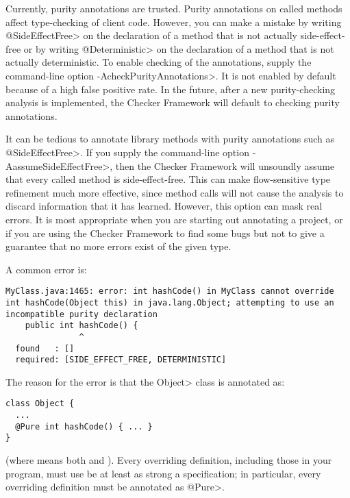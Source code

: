 
Currently, purity annotations are trusted.  Purity annotations on called
methods affect type-checking of client code.  However, you can make a
mistake by writing \<@SideEffectFree> on the declaration of a method that
is not actually side-effect-free or by writing \<@Deterministic> on the
declaration of a method that is not actually deterministic.  To enable
checking of the annotations, supply the command-line option
\<-AcheckPurityAnnotations>.  It is not enabled by default because of a high false
positive rate.  In the future, after a new purity-checking analysis is
implemented, the Checker Framework will default to checking purity
annotations.

It can be tedious to annotate library methods with purity annotations such
as \<@SideEffectFree>.  If you supply the command-line option
\<-AassumeSideEffectFree>, then the Checker Framework will unsoundly
assume that every called method is side-effect-free.  This can make
flow-sensitive type refinement much more effective, since method calls will
not cause the analysis to discard information that it has learned.
However, this option can mask real errors.  It is most appropriate when you
are starting out annotating a project, or if you are using the Checker
Framework to find some bugs but not to give a guarantee that no more errors
exist of the given type.

A common error is:

\begin{Verbatim}
MyClass.java:1465: error: int hashCode() in MyClass cannot override int hashCode(Object this) in java.lang.Object; attempting to use an incompatible purity declaration
    public int hashCode() {
               ^
  found   : []
  required: [SIDE_EFFECT_FREE, DETERMINISTIC]
\end{Verbatim}

\noindent
The reason for the error is that the \<Object> class is annotated as:

\begin{Verbatim}
class Object {
  ...
  @Pure int hashCode() { ... }
}
\end{Verbatim}

\noindent
(where  means both
 and
).  Every overriding
definition, including those in your program, must use be at least as strong
a specification; in particular, every overriding definition must be
annotated as \<@Pure>.

